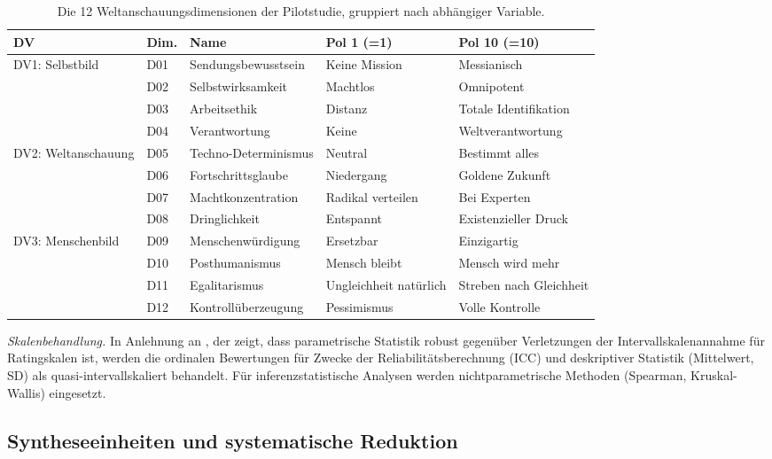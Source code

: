 \documentclass[11pt,a4paper]{article}
\begin{document}
\begin{table}[htbp]
  \centering
  \caption{Die 12 Weltanschauungsdimensionen der Pilotstudie, gruppiert nach abh\"angiger Variable.}
  \label{tab:dimensions}
  \small
  \begin{tabular}{l l l l l}
    \toprule
    \textbf{DV} & \textbf{Dim.} & \textbf{Name} & \textbf{Pol 1 (=1)} & \textbf{Pol 10 (=10)} \\
    \midrule
    \multirow{4}{*}{DV1: Selbstbild}
    & D01 & Sendungsbewusstsein & Keine Mission & Messianisch \\
    & D02 & Selbstwirksamkeit & Machtlos & Omnipotent \\
    & D03 & Arbeitsethik & Distanz & Totale Identifikation \\
    & D04 & Verantwortung & Keine & Weltverantwortung \\
    \midrule
    \multirow{4}{*}{DV2: Weltanschauung}
    & D05 & Techno-Determinismus & Neutral & Bestimmt alles \\
    & D06 & Fortschrittsglaube & Niedergang & Goldene Zukunft \\
    & D07 & Machtkonzentration & Radikal verteilen & Bei Experten \\
    & D08 & Dringlichkeit & Entspannt & Existenzieller Druck \\
    \midrule
    \multirow{4}{*}{DV3: Menschenbild}
    & D09 & Menschenw\"urdigung & Ersetzbar & Einzigartig \\
    & D10 & Posthumanismus & Mensch bleibt & Mensch wird mehr \\
    & D11 & Egalitarismus & Ungleichheit nat\"urlich & Streben nach Gleichheit \\
    & D12 & Kontroll\"uberzeugung & Pessimismus & Volle Kontrolle \\
    \bottomrule
  \end{tabular}
\end{table}

\emph{Skalenbehandlung.} In Anlehnung an \citet{Norman2010}, der zeigt, dass parametrische Statistik robust gegen\"uber Verletzungen der Intervallskalenannahme f\"ur Ratingskalen ist, werden die ordinalen Bewertungen f\"ur Zwecke der Reliabilit\"atsberechnung (ICC) und deskriptiver Statistik (Mittelwert, SD) als quasi-intervallskaliert behandelt. F\"ur inferenzstatistische Analysen werden nichtparametrische Methoden (Spearman, Kruskal-Wallis) eingesetzt.


\subsection{Syntheseeinheiten und systematische Reduktion}
\label{sec:method:su}
\end{document}
